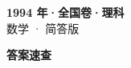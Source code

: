 \documentclass[zihao=-4, a4paper]{ctexart}
\begin{document}
\begin{center}
  {\Large\bfseries 1994 年·全国卷·理科}\\[4pt]
  {\large 数学 · 简答版}
\end{center}
\medskip
{}

\clearpage
{}
\begin{center}{\Large\bfseries 答案速查}\end{center}
\medskip

\end{document}
